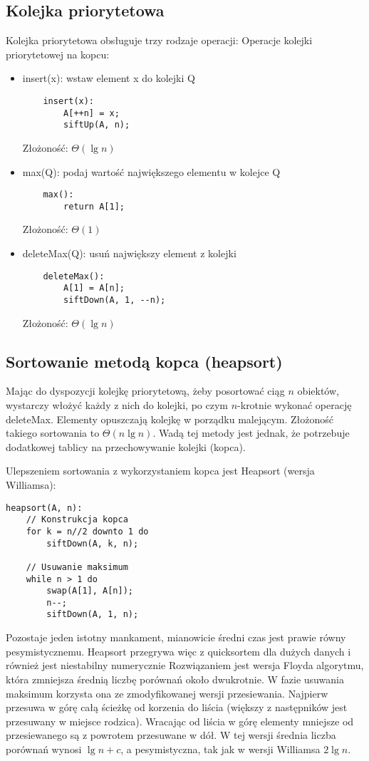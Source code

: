 \subsection{Kolejka priorytetowa}
Kolejka priorytetowa obsługuje trzy rodzaje operacji:
Operacje kolejki priorytetowej na kopcu:
\begin{itemize}
    \item insert(x): wstaw element x do kolejki Q
    \begin{verbatim}
    insert(x):
        A[++n] = x;
        siftUp(A, n);
    \end{verbatim}
    Złożoność: \( \Theta(\lg n) \)
    \item max(Q): podaj wartość największego elementu w kolejce Q
    \begin{verbatim}
    max():
        return A[1];
    \end{verbatim}
    Złożoność: \( \Theta(1) \)
    \item deleteMax(Q): usuń największy element z kolejki
    \begin{verbatim}
    deleteMax():
        A[1] = A[n];
        siftDown(A, 1, --n);
    \end{verbatim}
    Złożoność: \( \Theta(\lg n) \)
\end{itemize}

\subsection{Sortowanie metodą kopca (heapsort)}
Mając do dyspozycji kolejkę priorytetową, żeby posortować ciąg \( n \) obiektów, wystarczy włożyć każdy z nich do kolejki, po czym \( n \)-krotnie wykonać operację deleteMax.
Elementy opuszczają kolejkę w porządku malejącym. Złożoność takiego sortowania to \( \Theta(n \lg n) \). Wadą tej metody jest jednak, że potrzebuje dodatkowej tablicy na przechowywanie kolejki (kopca).

Ulepszeniem sortowania z wykorzystaniem kopca jest Heapsort (wersja Williamsa):
\begin{verbatim}
heapsort(A, n):
    // Konstrukcja kopca
    for k = n//2 downto 1 do
        siftDown(A, k, n);

    // Usuwanie maksimum
    while n > 1 do
        swap(A[1], A[n]);
        n--;
        siftDown(A, 1, n);
\end{verbatim}

Pozostaje jeden istotny mankament, mianowicie średni czas jest prawie równy pesymistycznemu. Heapsort przegrywa więc z quicksortem dla dużych danych i również jest niestabilny numerycznie
Rozwiązaniem jest wersja Floyda algorytmu, która zmniejsza średnią liczbę porównań około dwukrotnie.
W fazie usuwania maksimum korzysta ona ze zmodyfikowanej wersji przesiewania. Najpierw przesuwa w górę całą ścieżkę od korzenia do liścia (większy z następników jest przesuwany w miejsce
rodzica). Wracając od liścia w górę elementy mniejsze od przesiewanego są z powrotem przesuwane w dół.
W tej wersji średnia liczba porównań wynosi \( \lg n + c \), a pesymistyczna, tak jak w wersji Williamsa \( 2\lg n \).

